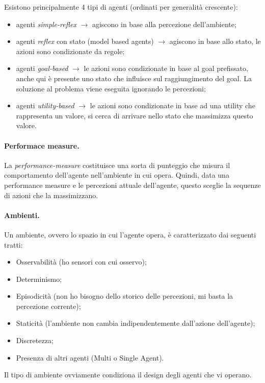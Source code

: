 \documentclass[a4paper, 11pt]{article}
\begin{document}
Esistono principalmente 4 tipi di agenti (ordinati per generalità crescente): 
\begin{itemize}
	\item agenti \textit{simple-reflex} $ \rightarrow $ agiscono in base alla percezione dell'ambiente;
	\item agenti \textit{reflex} con stato (model based agents) $ \rightarrow $ agiscono in base allo stato, le azioni sono condizionate da regole;
	\item agenti \textit{goal-based} $ \rightarrow $ le azioni sono condizionate in base al goal prefissato, anche qui è presente uno stato che influisce sul raggiungimento del goal. La soluzione al problema viene eseguita ignorando le percezioni;
	\item agenti \textit{utility-based} $ \rightarrow $ le azioni sono condizionate in base ad una utility che rappresenta un valore, si cerca di arrivare nello stato che massimizza questo valore.
\end{itemize}

\paragraph{Performace measure.} La \textit{performance-measure} costituisce una sorta di punteggio che misura il comportamento dell'agente nell'ambiente in cui opera. Quindi, data una performance measure e le percezioni attuale dell'agente, questo sceglie la sequenze di azioni che la massimizzano.

\paragraph{Ambienti.} Un ambiente, ovvero lo spazio in cui l'agente opera, è caratterizzato dai seguenti tratti: \begin{itemize}
	\item Osservabilità (ho sensori con cui osservo);
	\item Determinismo;
	\item Episodicità (non ho bisogno dello storico delle percezioni, mi basta la percezione corrente);
	\item Staticità (l'ambiente non cambia indipendentemente dall'azione dell'agente);
	\item Discretezza;
	\item Presenza di altri agenti (Multi o Single Agent).
\end{itemize}

Il tipo di ambiente ovviamente condiziona il design degli agenti che vi operano.
\end{document}
